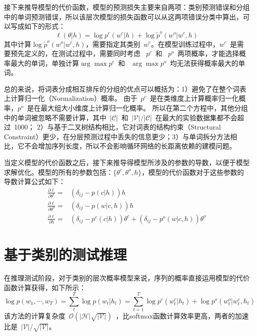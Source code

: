 接下来推导模型的代价函数，模型的预测损失主要来自两项：类别预测错误和分组中的单词预测错误，所以该层次模型的损失函数可以从这两项错误分类中算出，可以写成如下的形式：
\begin{equation}
\ell(\theta|h) =\log p^c(w^c|h) +\log \tilde  p^o(w^o|w^c,h)
\end{equation}
其中计算$\log \tilde  p^o(w^o|w^c,h)$，需要指定其类别~$w^c$。在模型训练过程中，$w^c$~是需要预先定义的，在测试过程中，需要同时考虑 ~$p^c$~和 ~$p^o$~两项概率，才能选择概率最大的单词，单独计算$\arg\max p^c$~和 ~$\arg\max p^o$~均无法获得概率最大的单词。

总的来说，将词表分成相互排斥的分组的优点可以概括为：1）避免了在整个词表上计算归一化（Normalization）概率。 由于~$p^c$~是在类维度上计算概率归一化概率，$p^o$~是在最大组大小维度上计算归一化概率。 所以在第二个方程中，其他分组中的单词被忽略不需要计算，其中~$\mathcal{|C|}$~和~$\mathcal{|V|}/\mathcal{|C|}$~在最大的实验数据集都不会超过~1000； 2）与基于二叉树结构相比，它对词表的结构约束（Structural Constraint）更少，在分层预测过程中丢失的信息更少；3）与单词拆分方法相比，它不会增加序列长度，所以不会影响循环网络的长距离依赖的建模问题。

当定义模型的代价函数之后，接下来推导得模型所涉及的参数的导数，以便于模型求解优化。模型的所有的参数包括：$\{\theta^c,\theta^o,h\}$，模型的代价函数对于这些参数的导数计算公式如下：
\begin{equation}
\begin{split}
\frac{\partial \ell}{\partial \theta^c}=& (\delta_{ij}-p(c|h))h \\
\frac{\partial \ell}{\partial \theta^o}=&(\delta_{ij}-p(w|c,h))h \\
\frac{\partial \ell}{\partial h}=&(\delta_{ij}-p^c(c|h))\theta^c + (\delta_{ij}-p^o(w|c,h))\theta^o
\end{split}
\end{equation}


\section{基于类别的测试推理}
在推理测试阶段，对于类别的层次概率模型来说，序列的概率直接运用模型的代价函数计算获得，如下所示：
\begin{equation}\label{equ:class_inf}
\log p(w_1,\cdots, w_T)=\sum_t^T\log p(w_t|h_t) =\sum_{t=1}^{T}\log p^c(w^c_t|h_t) +\log p^o(w^o_t|w^c_t,h_t)
\end{equation}
该方法的计算复杂度~$\mathcal{O(|H|\sqrt{|\mathcal{V}|})}$~，比softmax函数计算效率更高，两者的加速比是~$|\mathcal{V}|/\sqrt{|\mathcal{V}|}$。

